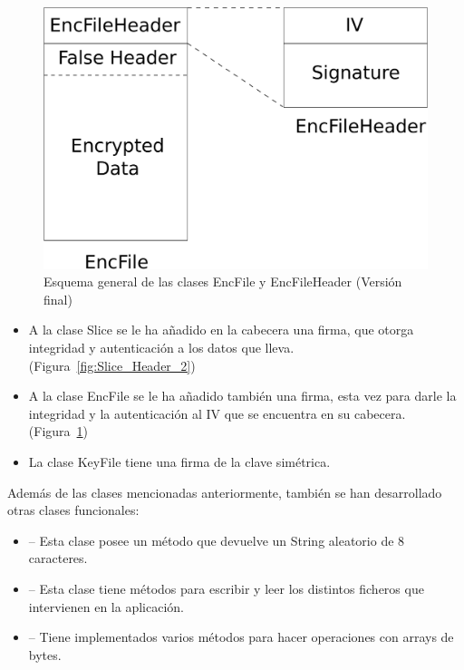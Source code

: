 \begin{figure}[ht]
  \centering
  \includegraphics[scale=0.4]{Figures/EncFile_Header_2}
  \decoRule
  \caption[EncFile - EncFileHeader (Versión final)]{Esquema general de las clases EncFile y EncFileHeader (Versión final)}
  \label{fig:EncFile_Header_2}
\end{figure}

\begin{itemize}
  \item A la clase Slice se le ha añadido en la cabecera una firma, que otorga
  integridad y autenticación a los datos que lleva.
  (Figura~\ref{fig:Slice_Header_2})

  \item A la clase EncFile se le ha añadido también una firma, esta vez para
  darle la integridad y la autenticación al IV que se encuentra en su cabecera.
  (Figura~\ref{fig:EncFile_Header_2})

  \item La clase KeyFile tiene una firma de la clave simétrica.
\end{itemize}

Además de las clases mencionadas anteriormente, también se han desarrollado
otras clases funcionales:

\begin{itemize}
  \item {} -- Esta clase posee un método que devuelve un
  String aleatorio de 8 caracteres.

  \item {} -- Esta clase tiene métodos para escribir y leer los
  distintos ficheros que intervienen en la aplicación.

  \item {} -- Tiene implementados varios métodos para hacer
  operaciones con arrays de bytes.
\end{itemize}

